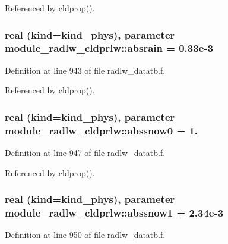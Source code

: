 Referenced by cldprop().

\subsubsection[{\texorpdfstring{absrain}{absrain}}]{\setlength{\rightskip}{0pt plus 5cm}real (kind=kind\+\_\+phys), parameter module\+\_\+radlw\+\_\+cldprlw\+::absrain = 0.\+33e-\/3}\hypertarget{group__module__radlw__main_ga04bff194fec27e0586ab1b4770319882}{}\label{group__module__radlw__main_ga04bff194fec27e0586ab1b4770319882}


Definition at line 943 of file radlw\+\_\+datatb.\+f.



Referenced by cldprop().

\subsubsection[{\texorpdfstring{abssnow0}{abssnow0}}]{\setlength{\rightskip}{0pt plus 5cm}real (kind=kind\+\_\+phys), parameter module\+\_\+radlw\+\_\+cldprlw\+::abssnow0 = 1.}\hypertarget{group__module__radlw__main_ga4bcd58c6a7e9abdfbb8f8ec7d925d143}{}\label{group__module__radlw__main_ga4bcd58c6a7e9abdfbb8f8ec7d925d143}


Definition at line 947 of file radlw\+\_\+datatb.\+f.



Referenced by cldprop().

\subsubsection[{\texorpdfstring{abssnow1}{abssnow1}}]{\setlength{\rightskip}{0pt plus 5cm}real (kind=kind\+\_\+phys), parameter module\+\_\+radlw\+\_\+cldprlw\+::abssnow1 = 2.\+34e-\/3}\hypertarget{group__module__radlw__main_ga7d12b328d9dec0c525a4b0824ae7ab44}{}\label{group__module__radlw__main_ga7d12b328d9dec0c525a4b0824ae7ab44}


Definition at line 950 of file radlw\+\_\+datatb.\+f.

